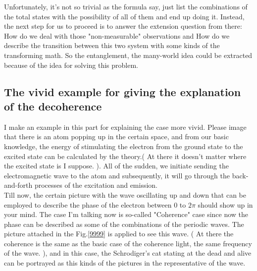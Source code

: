 \documentclass[final,1p,12pt]{elsarticle}
\begin{document}
Unfortunately, it's not so trivial as the formula say, just list the combinations of the total states with the possibility of all of them and end up doing it. Instead, the next step for us to proceed is to answer the extension question from there: How do we deal with those "non-measurable" observations and How do we describe the transition between this two system with some kinds of the transforming math. So the entanglement, the many-world idea could be extracted because of the idea for solving this problem.\\

\subsection{The vivid example for giving the explanation of the decoherence}
I make an example in this part for explaining the case more vivid. Please image that there is an atom popping up in the certain space, and from our basic knowledge, the energy of stimulating the electron from the ground state to the excited state can be calculated by the theory.( At there it doesn't matter where the excited state is I suppose. ). All of the sudden, we initiate sending the electromagnetic wave to the atom and subsequently, it will go through the back-and-forth processes of the excitation and emission. \\

Till now, the certain picture with the wave oscillating up and down that can be employed to describe the phase of the electron between 0 to $2\pi$ should show up in your mind. The case I'm talking now is so-called "Coherence" case since now the phase can be described as some of the combinations of the periodic waves. The picture attached in the Fig.\ref{9999} is applied to see this wave. ( At there the coherence is the same as the basic case of the coherence light, the same frequency of the wave. ), and in this case, the Schrodiger's cat stating at the dead and alive can be portrayed as this kinds of the pictures in the representative of the wave.\\ 
\end{document}
